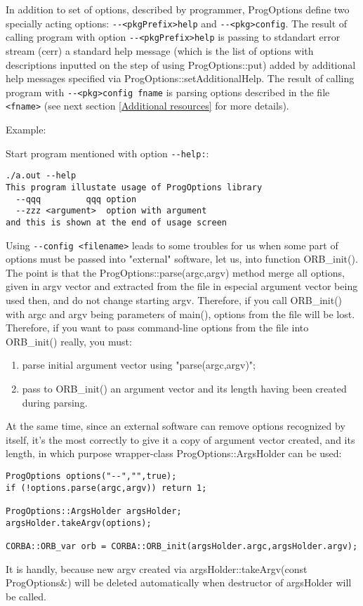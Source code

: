 \documentclass[10pt]{article}
\begin{document}
  In addition to set of options, described by programmer, ProgOptions define
two specially acting options: \verb|--<pkgPrefix>help| and \verb|--<pkg>config|.
The result of calling program with option \verb|--<pkgPrefix>help| is passing
to stdandart error stream (cerr) a standard help message (which is the list of options
with descriptions inputted on the step of using ProgOptions::put) added by additional
help messages specified via ProgOptions::setAdditionalHelp.
The result of calling program with \verb|--<pkg>config fname| is parsing options described
in the file \verb|<fname>| (see next section \ref{Additional resources} for more details).

Example:

	Start program mentioned with option \verb|--help:|:

\begin{verbatim}
./a.out --help
This program illustate usage of ProgOptions library
  --qqq 		qqq option
  --zzz <argument> 	option with argument
and this is shown at the end of usage screen
\end{verbatim}

Using \verb|--config <filename>| leads to some troubles for us
when some part of options must be passed into "external" software,
let us, into function ORB\_init().
The point is that the ProgOptions::parse(argc,argv) method merge all options,
given in argv vector and extracted from the file 
in especial argument vector being used then, and do not change starting argv.
Therefore, if you call ORB\_init() with argc and argv being parameters of main(),
options from the file will be lost.
Therefore, if you want to pass command-line options from the file into ORB\_init() really,
you must:
\begin{enumerate}
\item parse initial argument vector using "parse(argc,argv)";
\item pass to ORB\_init() an argument vector and its length
      having been created during parsing.
\end{enumerate}
At the same time, since an external software can remove options recognized by itself,
it's the most correctly to give it a copy of argument vector created, and its length, 
in which purpose wrapper-class ProgOptions::ArgsHolder can be used:
\begin{verbatim}
ProgOptions options("--","",true);
if (!options.parse(argc,argv)) return 1;

ProgOptions::ArgsHolder argsHolder;
argsHolder.takeArgv(options);

CORBA::ORB_var orb = CORBA::ORB_init(argsHolder.argc,argsHolder.argv);
\end{verbatim}
It is handly, because new argv created via argsHolder::takeArgv(const ProgOptions\&)
will be deleted automatically when destructor of argsHolder will be called.
\end{document}
